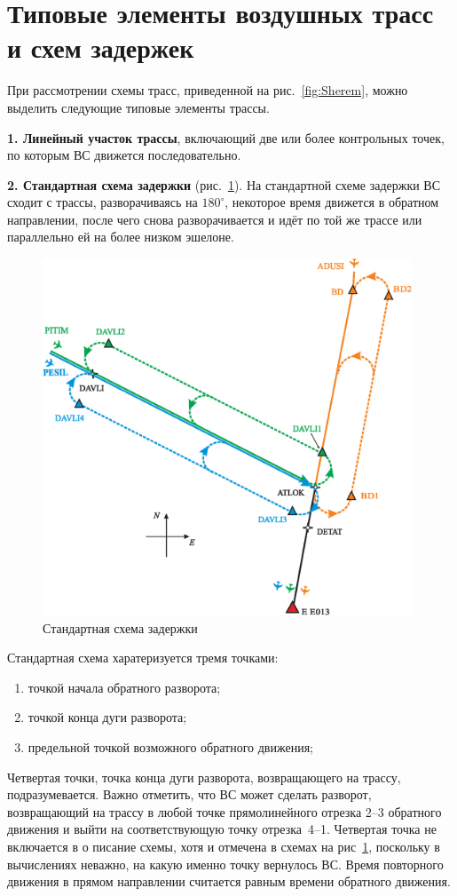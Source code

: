 \documentclass[12pt]{article}
\theoremstyle{plain}
\begin{document}
\section{Типовые элементы воздушных трасс и схем задержек}

При рассмотрении схемы трасс, приведенной на рис.~\ref{fig:Sherem}, можно выделить следующие типовые элементы трассы.

\textbf{1. Линейный участок трассы}, включающий две или более контрольных точек, по которым ВС движется последовательно.

\textbf{2. Стандартная схема задержки} (рис.~\ref{fig:StandardScheme}). На стандартной схеме задержки ВС сходит с трассы, разворачиваясь на $180^\circ$, некоторое время движется в обратном направлении, после чего снова разворачивается и идёт по той же трассе или параллельно ей на более низком эшелоне. 

\begin{figure}[h]
  \centering

  \includegraphics[width=11cm]{Scheme01_plane.eps}    %

  \caption{Стандартная схема задержки} 
  \label{fig:StandardScheme}
\end{figure}

Стандартная схема харатеризуется тремя точками:
\begin{enumerate}[topsep=-0.5\parsep,itemsep=-0.5\parsep]
  \item точкой начала обратного разворота; 
  \item точкой конца дуги разворота;
  \item предельной точкой возможного обратного движения;
\end{enumerate}
Четвертая точки, точка конца дуги разворота, возвращающего на трассу, подразумевается.  Важно отметить, что ВС может сделать разворот, возвращающий на трассу в любой точке прямолинейного отрезка 2--3 обратного движения и выйти на соответствующую точку отрезка~4--1. Четвертая точка не включается в о писание схемы, хотя и отмечена в схемах на рис~\ref{fig:StandardScheme}, поскольку в вычислениях неважно, на какую именно точку вернулось ВС. Время повторного движения в прямом направлении считается равным времени обратного движения.
\end{document}
